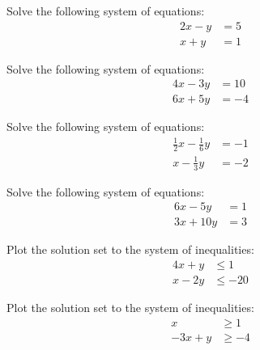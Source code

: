 \documentclass[11pt,letterpaper]{article}
\begin{document}

 Solve the following system of equations:
	\[
	\begin{aligned}
	2x - y&= 5 \\
	x + y&= 1
	\end{aligned}
	\]



\newpage



 Solve the following system of equations:
	\[
	\begin{aligned}
	4x - 3y&= 10 \\
	6x + 5y&= -4
	\end{aligned}
	\]



 Solve the following system of equations:
	\[
	\begin{aligned}
	\frac{1}{2}x - \frac{1}{6}y&= -1 \\
	x - \frac{1}{3}y&= -2 
	\end{aligned}
	\]



\newpage



 Solve the following system of equations:
	\[
	\begin{aligned}
	6x - 5y&= 1 \\
	3x + 10y&= 3
	\end{aligned}
	\]



\newpage



 Plot the solution set to the system of inequalities: 
	\[
	\begin{aligned}
	4x + y&\leq 1 \\
	x - 2y&\leq -20
	\end{aligned}
	\]



\newpage



 Plot the solution set to the system of inequalities: 
	\[
	\begin{aligned}
	x&\geq 1 \\
	-3x + y&\geq -4
	\end{aligned}
	\]
\end{document}
